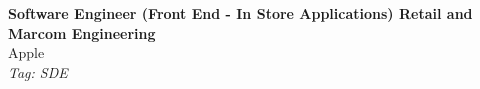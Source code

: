 \documentclass[11pt]{article}
\begin{document}
\begin{center}
  {\LARGE \textbf{Software Engineer (Front End - In Store Applications) Retail and Marcom Engineering}} \\[4pt]
  {\large Apple} \\[2pt]
  {\small \textit{Tag: SDE}}
\end{center}

\vspace{1em}
\noindent
\end{document}
